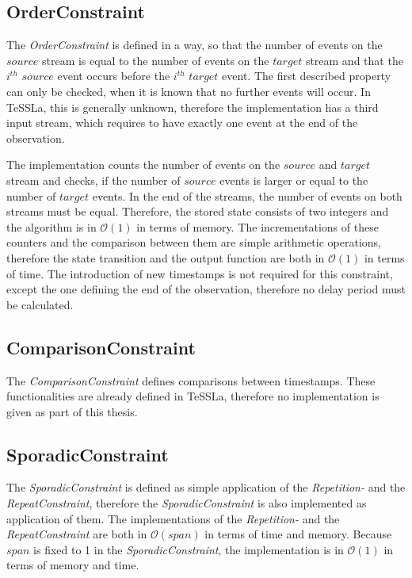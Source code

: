 \subsection{OrderConstraint}
	The \emph{OrderConstraint} is defined in a way, so that the number of events on the $source$ stream is equal to the number of events on the $target$ stream and that the $i^{th}$ $source$ event occurs before the  $i^{th}$ $target$ event. The first described property can only be checked, when it is known that no further events will occur. In TeSSLa, this is generally unknown, therefore the implementation has a third input stream, which requires to have exactly one event at the end of the observation.
	
	The implementation counts the number of events on the $source$ and $target$ stream and checks, if the number of $source$ events is larger or equal to the number of $target$ events. In the end of the streams, the number of events on both streams must be equal. Therefore, the stored state consists of two integers and the algorithm is in $\mathcal{O}(1)$ in terms of memory. The incrementations of these counters and the comparison between them are simple arithmetic operations, therefore the state transition and the output function are both in $\mathcal{O}(1)$ in terms of time. The introduction of new timestamps is not required for this constraint, except the one defining the end of the observation, therefore no delay period must be calculated.
	
\subsection{ComparisonConstraint}
	The \emph{ComparisonConstraint} defines comparisons between timestamps. These functionalities are already defined in TeSSLa, therefore no implementation is given as part of this thesis.  
	
\subsection{SporadicConstraint}
	The \emph{SporadicConstraint} is defined as simple application of the \emph{Repetition-} and the \emph{RepeatConstraint}, therefore the \emph{SporadicConstraint} is also implemented as application of them. The implementations of the \emph{Repetition-} and the \emph{RepeatConstraint} are both in $\mathcal{O}(span)$ in terms of time and memory. Because $span$ is fixed to 1 in the \textit{SporadicConstraint}, the implementation is in $\mathcal{O}(1)$ in terms of memory and time.
	

